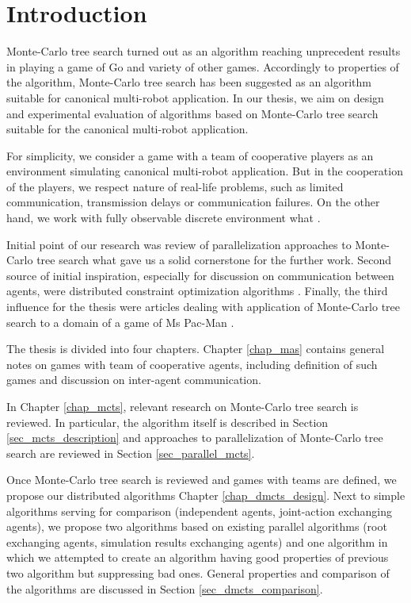 \chapter*{Introduction}

Monte-Carlo tree search turned out as an algorithm reaching unprecedent results in playing a
game of Go \cite{Chaslot2008} and variety of other games. Accordingly to properties of the
algorithm, Monte-Carlo tree search has been suggested as an algorithm suitable for canonical 
multi-robot
application. In our thesis, we aim on design and experimental evaluation of algorithms based on
Monte-Carlo tree search suitable for the canonical multi-robot application.

For simplicity, we consider a game with a team of cooperative players as an environment
simulating canonical multi-robot application. But in the cooperation
of the players, we respect nature of real-life problems, such as limited communication,
transmission delays or communication failures. On the other hand, we work with fully
observable discrete environment what .

Initial point of our research was review of parallelization approaches to Monte-Carlo tree 
search \cites{Cazenave2007}{Chaslot2008}{Teytaud2008} what gave us a solid cornerstone for the
further work. Second source of initial inspiration, especially for discussion on communication
between agents, were distributed constraint optimization algorithms \cite{Zivan2009}. Finally,
the third influence for the thesis were articles dealing with application of Monte-Carlo tree
search to a domain of a game of Ms Pac-Man \cites{Ikehata2011}{Nguyen2011}.

The thesis is divided into four chapters. Chapter \ref{chap_mas} contains general notes on games 
with team
of cooperative agents, including definition of such games and discussion on inter-agent
communication. 

In Chapter \ref{chap_mcts}, relevant research on Monte-Carlo tree search is reviewed. 
In particular, the algorithm itself is described in Section \ref{sec_mcts_description}
 and approaches to parallelization of Monte-Carlo tree
search are reviewed in Section \ref{sec_parallel_mcts}. 

Once Monte-Carlo tree search is
reviewed and games with teams are defined, we propose our distributed algorithms Chapter
\ref{chap_dmcts_design}. Next to simple algorithms serving for comparison (independent agents,
joint-action exchanging agents), we propose two algorithms based on existing parallel
algorithms (root exchanging agents, simulation results exchanging agents) and one algorithm
in which we attempted to create an algorithm having good properties of previous two algorithm
but suppressing bad ones. General properties and comparison of the algorithms are discussed 
in Section \ref{sec_dmcts_comparison}.

